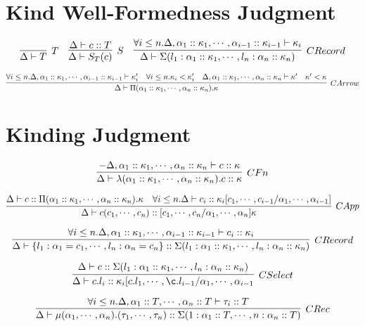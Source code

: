 \documentclass{article}
\begin{document}
\section{Kind Well-Formedness Judgment}

$$
\infer[T]{\Delta \vdash T}{}
\quad
\infer[S]{\Delta \vdash \Sing{c}}
{
	\Delta \vdash c :: T
}
\quad
\infer[CRecord]{\Delta \vdash \DRecord{l_1: \alpha_1:: \kappa_1, \cdots, l_n: \alpha_n:: \kappa_n}}
{
	\forall i \leq n . \Delta, \alpha_1:: \kappa_1, \cdots, \alpha_{i-1}:: \kappa_{i-1} \vdash \kappa_i
}
$$

$$
\infer[CArrow]{\Delta \vdash \DArrow{\alpha_1:: \kappa_1, \cdots, \alpha_n:: \kappa_n}{\kappa}}
{
	\forall i \leq n . \Delta, \alpha_1:: \kappa_1, \cdots, \alpha_{i-1}:: \kappa_{i-1} \vdash \kappa'_i
	\quad \forall i \leq n . \kappa_i < \kappa'_i
	\quad \Delta, \alpha_1:: \kappa_1, \cdots, \alpha_n:: \kappa_n \vdash \kappa'
	\quad \kappa' < \kappa
}
$$

\section{Kinding Judgment}

$$
\infer[CFn]{\Delta \vdash \CFn{\alpha_1::\kappa_1,\cdots,\alpha_n::\kappa_n}{c} :: \kappa}
{-
	\Delta, \alpha_1::\kappa_1,\cdots,\alpha_n::\kappa_n \vdash c :: \kappa
}
$$

$$
\infer[CApp]{\Delta \vdash \CApp{c}{c_1,\cdots,c_n} :: [c_1,\cdots,c_n/\alpha_1,\cdots,\alpha_n]\kappa}
{
	\Delta \vdash c :: \DArrow{\alpha_1:: \kappa_1, \cdots, \alpha_n:: \kappa_n}{\kappa}
	\quad \forall i \leq n . \Delta \vdash c_i:: \kappa_i[c_1,\cdots,c_{i-1}/\alpha_1,\cdots,\alpha_{i-1}]
}
$$

$$
\infer[CRecord]{\Delta \vdash \CRecord{l_1: \alpha_1 = c_1, \cdots, l_n: \alpha_n = c_n} :: \DRecord{l_1: \alpha_1:: \kappa_1, \cdots, l_n: \alpha_n:: \kappa_n}}
{
	\forall i \leq n . \Delta, \alpha_1:: \kappa_1, \cdots, \alpha_{i-1}:: \kappa_{i-1} \vdash c_i:: \kappa_i
}
$$

$$
\infer[CSelect]{\Delta \vdash \CSelect{c}{l_i} :: \kappa_i[c.l_1,\cdots,\c.l_{i-1}/\alpha_1,\cdots,\alpha_{i-1}}
{
	\Delta \vdash c :: \DRecord{l_1: \alpha_1:: \kappa_1, \cdots, l_n: \alpha_n:: \kappa_n}
}
$$

$$
\infer[CRec]{\Delta \vdash \Rec{\alpha_1,\cdots,\alpha_n}{\tau_1,\cdots,\tau_n} :: \DRecord{1: \alpha_1:: T, \cdots, n: \alpha_n:: T}}
{
	\forall i \leq n . \Delta, \alpha_1::T, \cdots, \alpha_n::T \vdash \tau_i :: T
}
$$
\end{document}
